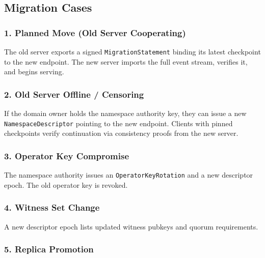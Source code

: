 \documentclass[
]{article}
\begin{document}
\hypertarget{migration-cases}{%
\subsection{Migration Cases}\label{migration-cases}}

\hypertarget{planned-move-old-server-cooperating}{%
\subsubsection{1. Planned Move (Old Server
Cooperating)}\label{planned-move-old-server-cooperating}}

The old server exports a signed \texttt{MigrationStatement} binding its
latest checkpoint to the new endpoint. The new server imports the full
event stream, verifies it, and begins serving.

\hypertarget{old-server-offline-censoring}{%
\subsubsection{2. Old Server Offline /
Censoring}\label{old-server-offline-censoring}}

If the domain owner holds the namespace authority key, they can issue a
new \texttt{NamespaceDescriptor} pointing to the new endpoint. Clients
with pinned checkpoints verify continuation via consistency proofs from
the new server.

\hypertarget{operator-key-compromise}{%
\subsubsection{3. Operator Key
Compromise}\label{operator-key-compromise}}

The namespace authority issues an \texttt{OperatorKeyRotation} and a new
descriptor epoch. The old operator key is revoked.

\hypertarget{witness-set-change}{%
\subsubsection{4. Witness Set Change}\label{witness-set-change}}

A new descriptor epoch lists updated witness pubkeys and quorum
requirements.

\hypertarget{replica-promotion}{%
\subsubsection{5. Replica Promotion}\label{replica-promotion}}
\end{document}

